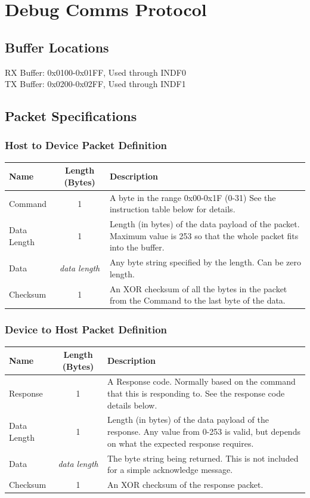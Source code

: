 \documentclass[a4paper,10pt]{book}
\begin{document}
\chapter{Debug Comms Protocol}
\label{chap:comms}
\section{Buffer Locations}
RX Buffer: 0x0100-0x01FF, Used through INDF0\\
TX Buffer: 0x0200-0x02FF, Used through INDF1

\section{Packet Specifications}
\subsection{Host to Device Packet Definition}
\begin{tabular}{l|c|p{6cm}}
 \textbf{Name}&\textbf{Length (Bytes)}&\textbf{Description}\\
\hline
 Command&1&A byte in the range 0x00-0x1F (0-31) See the instruction table below for details.\\
\hline
 Data Length&1&Length (in bytes) of the data payload of the packet.  Maximum value is 253 so that the whole packet fits into the buffer.\\
\hline
 Data&\textit{data length}&Any byte string specified by the length.  Can be zero length.\\
\hline
 Checksum&1&An XOR checksum of all the bytes in the packet from the Command to the last byte of the data.\\
\end{tabular}

\subsection{Device to Host Packet Definition}
\begin{tabular}{l|c|p{6cm}}
 \textbf{Name}&\textbf{Length (Bytes)}&\textbf{Description}\\
\hline
 Response&1&A Response code.  Normally based on the command that this is responding to.  See the response code details below.\\
\hline
 Data Length&1&Length (in bytes) of the data payload of the response.  Any value from 0-253 is valid, but depends on what the expected response requires.\\
\hline
 Data&\textit{data length}&The byte string being returned.  This is not included for a simple acknowledge message.\\
\hline
 Checksum&1&An XOR checksum of the response packet.\\
\end{tabular}
\end{document}
